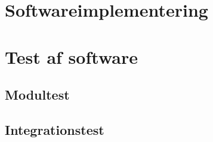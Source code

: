 \section{Softwareimplementering}
\section{Test af software}
\subsection{Modultest}
\subsection{Integrationstest}
